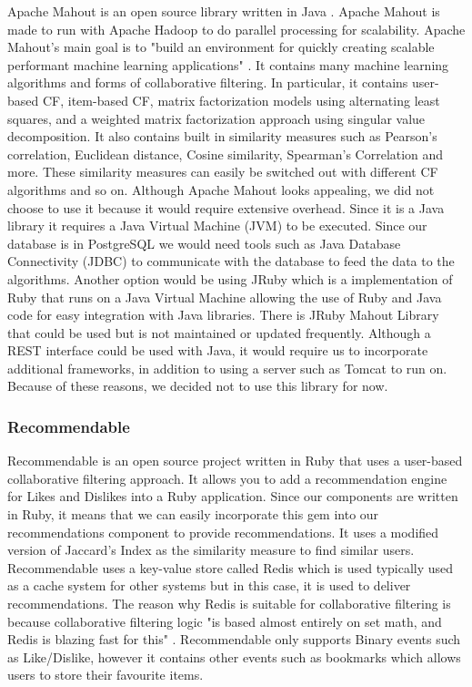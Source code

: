 Apache Mahout is an open source library written in Java \cite{mahout, mahoutaction}. Apache Mahout is made to run with Apache Hadoop to do parallel processing for scalability. Apache Mahout's main goal is to "build an environment for quickly creating scalable performant machine learning applications" \cite{mahout}. It contains many machine learning algorithms and forms of collaborative filtering. In particular, it contains user-based CF, item-based CF, matrix factorization models using alternating least squares, and a weighted matrix factorization approach using singular value decomposition. It also contains built in similarity measures such as Pearson's correlation, Euclidean distance, Cosine similarity, Spearman's Correlation and more. These similarity measures can easily be switched out with different CF algorithms and so on. 
Although Apache Mahout looks appealing, we did not choose to use it because it would require extensive overhead. Since it is a Java library it requires a Java Virtual Machine (JVM) to be executed. Since our database is in PostgreSQL we would need tools such as Java Database Connectivity (JDBC) to communicate with the database to feed the data to the algorithms. Another option would be using JRuby which is a implementation of Ruby that runs on a Java Virtual Machine allowing the use of Ruby and Java code for easy integration with Java libraries.
There is JRuby Mahout Library that could be used but is not maintained or updated frequently. Although a REST interface could be used with Java, it would require us to incorporate additional frameworks, in addition to using a server such as Tomcat to run on. Because of these reasons, we decided not to use this library for now.

\subsubsection{Recommendable}

Recommendable is an open source project written in Ruby that uses a user-based collaborative filtering approach. It allows you to add a recommendation engine for Likes and Dislikes into a Ruby application. Since our components are written in Ruby, it means that we can easily incorporate this gem into our recommendations component to provide recommendations. It uses a modified version of Jaccard's Index as the similarity measure to find similar users. Recommendable uses a key-value store called Redis which is used typically used as a cache system for other systems but in this case, it is used to deliver recommendations. The reason why Redis is suitable for collaborative filtering is because collaborative filtering logic "is based almost entirely on set math, and Redis is blazing fast for this" \cite{recommendable}. Recommendable only supports Binary events such as Like/Dislike, however it contains other events such as bookmarks which allows users to store their favourite items. 


